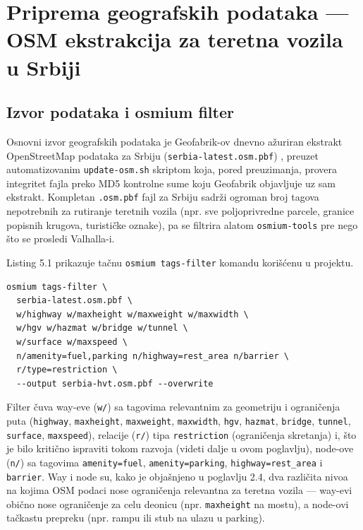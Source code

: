 \chapter{Priprema geografskih podataka — OSM ekstrakcija za teretna vozila u Srbiji}

\section{Izvor podataka i osmium filter}

Osnovni izvor geografskih podataka je Geofabrik-ov dnevno ažuriran ekstrakt OpenStreetMap podataka za Srbiju (\texttt{serbia-latest.osm.pbf}) \cite{geofabrik}, preuzet automatizovanim \texttt{update-osm.sh} skriptom koja, pored preuzimanja, provera integritet fajla preko MD5 kontrolne sume koju Geofabrik objavljuje uz sam ekstrakt. Kompletan \texttt{.osm.pbf} fajl za Srbiju sadrži ogroman broj tagova nepotrebnih za rutiranje teretnih vozila (npr. sve poljoprivredne parcele, granice popisnih krugova, turističke oznake), pa se filtrira alatom \texttt{osmium-tools} \cite{osmium} pre nego što se prosledi Valhalla-i.

Listing 5.1 prikazuje tačnu \texttt{osmium tags-filter} komandu korišćenu u projektu.

\begin{lstlisting}[caption={Osmium filter za ekstrakciju podataka relevantnih za teretni saobraćaj}]
osmium tags-filter \
  serbia-latest.osm.pbf \
  w/highway w/maxheight w/maxweight w/maxwidth \
  w/hgv w/hazmat w/bridge w/tunnel \
  w/surface w/maxspeed \
  n/amenity=fuel,parking n/highway=rest_area n/barrier \
  r/type=restriction \
  --output serbia-hvt.osm.pbf --overwrite
\end{lstlisting}

Filter čuva way-eve (\texttt{w/}) sa tagovima relevantnim za geometriju i ograničenja puta (\texttt{highway}, \texttt{maxheight}, \texttt{maxweight}, \texttt{maxwidth}, \texttt{hgv}, \texttt{hazmat}, \texttt{bridge}, \texttt{tunnel}, \texttt{surface}, \texttt{maxspeed}), relacije (\texttt{r/}) tipa \texttt{restriction} (ograničenja skretanja) i, što je bilo kritično ispraviti tokom razvoja (videti dalje u ovom poglavlju), node-ove (\texttt{n/}) sa tagovima \texttt{amenity=fuel}, \texttt{amenity=parking}, \texttt{highway=rest\_area} i \texttt{barrier}. Way i node su, kako je objašnjeno u poglavlju 2.4, dva različita nivoa na kojima OSM podaci nose ograničenja relevantna za teretna vozila — way-evi obično nose ograničenje za celu deonicu (npr. \texttt{maxheight} na mostu), a node-ovi tačkastu prepreku (npr. rampu ili stub na ulazu u parking).

